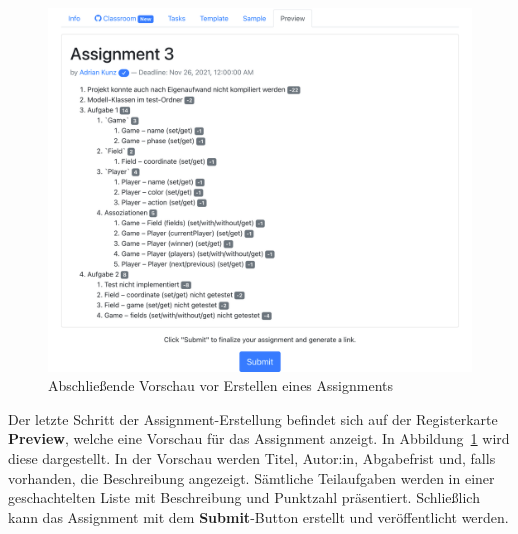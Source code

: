 \begin{figure}
    \centering
    \includegraphics[width=\textwidth]{images/assignment-create-preview}
    \caption{Abschließende Vorschau vor Erstellen eines Assignments}
    \label{fig:assignment-create-preview}
\end{figure}

Der letzte Schritt der Assignment-Erstellung befindet sich auf der Registerkarte \textbf{Preview}, welche eine Vorschau für das Assignment anzeigt.
In Abbildung~\ref{fig:assignment-create-preview} wird diese dargestellt.
In der Vorschau werden Titel, Autor:in, Abgabefrist und, falls vorhanden, die Beschreibung angezeigt.
Sämtliche Teilaufgaben werden in einer geschachtelten Liste mit Beschreibung und Punktzahl präsentiert.
Schließlich kann das Assignment mit dem \textbf{Submit}-Button erstellt und veröffentlicht werden.

